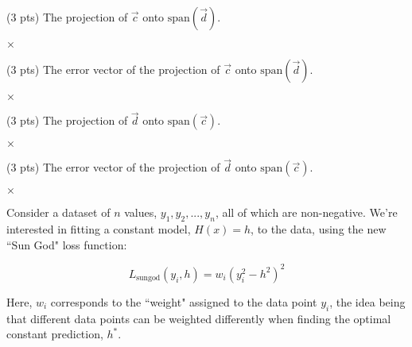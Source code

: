 \documentclass[twoside,12pt]{article}
\begin{document}
\begin{probset}
\begin{prob}[(14 pts)]
\begin{subprobset}
\begin{subprob}
\end{subprob}

\begin{subprob}(3 pts) The projection of $\vec{c}$ onto $\text{span}(\vec{d})$.

\inlineresponsebox[1.5in]{1in} $\times$    

\end{subprob}

\begin{subprob}(3 pts) The error vector of the projection of $\vec{c}$ onto $\text{span}(\vec{d})$.

\inlineresponsebox[1.5in]{1in} $\times$    

\end{subprob}

\begin{subprob}(3 pts) The projection of $\vec{d}$ onto $\text{span}(\vec{c})$.

\inlineresponsebox[1.5in]{1in} $\times$    

\end{subprob}

\begin{subprob}(3 pts) The error vector of the projection of $\vec{d}$ onto $\text{span}(\vec{c})$.

\inlineresponsebox[1.5in]{1in} $\times$    

\end{subprob}
    
\end{subprobset}
    
\end{prob}

\newpage

\begin{prob}[(11 pts)]

Consider a dataset of $n$ values, $y_1, y_2, ..., y_n$, all of which are non-negative. We're interested in fitting a constant model, $H(x) = h$, to the data, using the new ``Sun God" loss function:

$$L_\text{sungod}(y_i, h) = w_i \left( y_i^2 - h^2  \right)^2$$

Here, $w_i$ corresponds to the ``weight" assigned to the data point $y_i$, the idea being that different data points can be weighted differently when finding the optimal constant prediction, $h^*$. 


\end{prob}
\end{probset}
\end{document}
